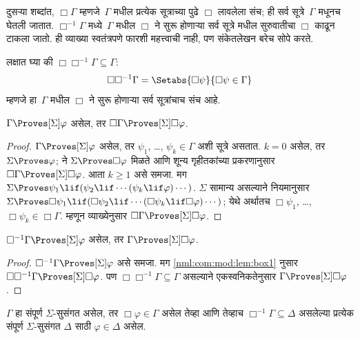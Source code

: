 दुसऱ्या शब्दांत, $\Box\Gamma$ म्हणजे~$\Gamma$ मधील
प्रत्येक सूत्राच्या पुढे $\Box$ लावलेला संच;
ही सर्व सूत्रे~$\Gamma$ मधूनच घेतली जातात.
$\Box^{-1}\Gamma$ मध्ये~$\Gamma$ मधील $\Box$ ने
सुरू होणाऱ्या सर्व सूत्रे मधील सुरुवातीचा
$\Box$ काढून टाकला जातो. ही व्याख्या स्वतंत्रपणे
फारशी महत्त्वाची नाही, पण संकेतलेखन बरेच सोपे करते.

लक्षात घ्या की $\Box\Box^{-1}\Gamma \subseteq \Gamma$:
\[\Box\Box^{-1}\Gamma = \Setabs{\Box\psi}{\Box\psi \in \Gamma}
\]
म्हणजे हा~$\Gamma$ मधील $\Box$ ने सुरू होणाऱ्या
सर्व सूत्रांचाच संच आहे.

\begin{lem}\label{nml:com:mod:lem:box1}
  $\Gamma \Proves[\Sigma] \varphi$ असेल, तर
  $\Box\Gamma \Proves[\Sigma] \Box \varphi$.
\end{lem}

\begin{proof}
  $\Gamma \Proves[\Sigma] \varphi$ असेल, तर
  $\psi_1$, \dots, $\psi_k \in \Gamma$ अशी सूत्रे
  असतात. $k=0$ असेल, तर $\Sigma \Proves \varphi$;
  \Nec{} ने $\Sigma \Proves \Box\varphi$ मिळते आणि
  शून्य गृहीतकांच्या प्रकरणानुसार $\Box\Gamma \Proves[\Sigma] \Box\varphi$.
  आता $k\geq1$ असे समजा. मग $\Sigma \Proves \psi_1 \lif (\psi_2 \lif \cdots
  (\psi_k \lif \varphi)\cdots)$. $\Sigma$ सामान्य असल्याने
  \RK{} नियमानुसार $\Sigma \Proves \Box\psi_1 \lif
  (\Box\psi_2 \lif \cdots (\Box\psi_k \lif \Box\varphi)\cdots)$;
  येथे अर्थातच $\Box\psi_1$, \dots, $\Box\psi_k \in
  \Box\Gamma$. म्हणून व्याख्येनुसार
  $\Box\Gamma \Proves[\Sigma] \Box \varphi$.
\end{proof}

\begin{lem}\label{nml:com:mod:lem:box2}
  $\Box^{-1} \Gamma \Proves[\Sigma] \varphi$ असेल,
  तर $\Gamma \Proves[\Sigma] \Box\varphi$.
\end{lem}

\begin{proof}
  $\Box^{-1}\Gamma \Proves[\Sigma] \varphi$ असे
  समजा. मग \ref{nml:com:mod:lem:box1} नुसार
  $\Box\Box^{-1}\Gamma \Proves[\Sigma] \Box\varphi$.
  पण $\Box\Box^{-1}\Gamma \subseteq \Gamma$
  असल्याने एकस्वनिकतेनुसार
  $\Gamma \Proves[\Sigma] \Box\varphi$.
\end{proof}




\begin{prop}\label{nml:com:mod:prop:box}
  $\Gamma$ हा संपूर्ण $\Sigma$-सुसंगत असेल,
  तर $\Box \varphi \in \Gamma$ असेल तेव्हा आणि
  तेव्हाच $\Box^{-1} \Gamma \subseteq \Delta$
  असलेल्या प्रत्येक संपूर्ण $\Sigma$-सुसंगत
  $\Delta$ साठी $\varphi \in \Delta$ असेल.
\end{prop}

